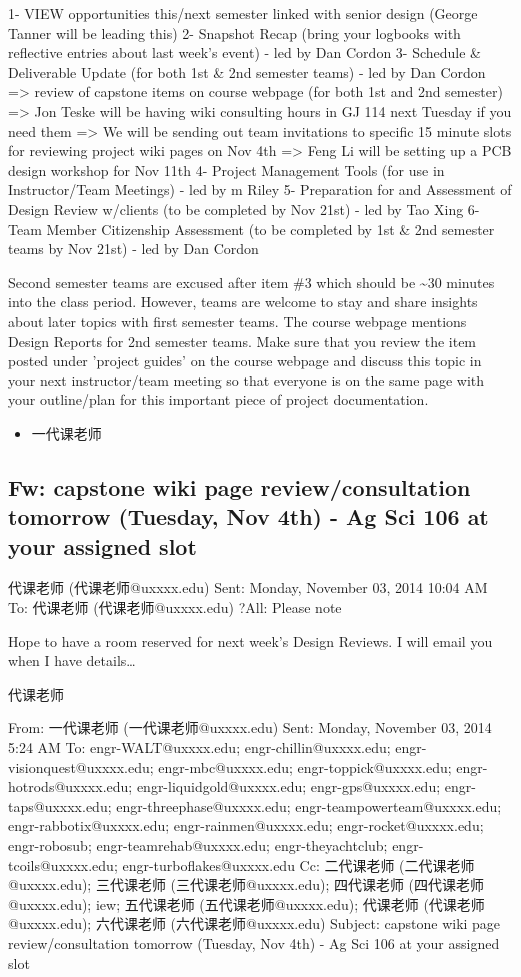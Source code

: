 \documentclass[12pt]{book}
\begin{document}
1- VIEW opportunities this/next semester linked with senior design (George Tanner will be leading this)
2- Snapshot Recap (bring your logbooks with reflective entries about last week's event) - led by Dan Cordon
3- Schedule \& Deliverable Update (for both 1st \& 2nd semester teams) - led by Dan Cordon
=> review of capstone items on course webpage (for both 1st and 2nd semester)
=> Jon Teske will be having wiki consulting hours in GJ 114 next Tuesday if you need them
=> We will be sending out team invitations to specific 15 minute slots for reviewing project wiki pages on Nov 4th
=> Feng Li will be setting up a PCB design workshop for Nov 11th
4- Project Management Tools (for use in Instructor/Team Meetings) - led by m Riley
5- Preparation for and Assessment of Design Review w/clients (to be completed by Nov 21st) - led by Tao Xing
6- Team Member Citizenship Assessment (to be completed by 1st \& 2nd semester teams by Nov 21st) - led by Dan Cordon

Second semester teams are excused after item \#3 which should be \textasciitilde{}30 minutes into the class period.  However, teams are welcome to stay and share insights about later topics with first semester teams.  The course webpage mentions Design Reports for 2nd semester teams.  Make sure that you review the item posted under 'project guides' on the course webpage and discuss this topic in your next instructor/team meeting so that everyone is on the same page with your outline/plan for this important piece of project documentation.

\begin{itemize}
\item 一代课老师
\end{itemize}

\subsection{Fw: capstone wiki page review/consultation tomorrow (Tuesday, Nov 4th) - Ag Sci 106 at your assigned slot}
\label{sec-18-1-2}
代课老师 (代课老师@uxxxx.edu)
Sent:        Monday, November 03, 2014 10:04 AM
To:        
代课老师 (代课老师@uxxxx.edu)
?All:  Please note

Hope to have a room reserved for next week's Design Reviews.  I will email
you when I have details\ldots{}

代课老师

From: 一代课老师 (一代课老师@uxxxx.edu)
Sent: Monday, November 03, 2014 5:24 AM
To: engr-WALT@uxxxx.edu; engr-chillin@uxxxx.edu; engr-visionquest@uxxxx.edu; engr-mbc@uxxxx.edu; engr-toppick@uxxxx.edu; engr-hotrods@uxxxx.edu; engr-liquidgold@uxxxx.edu; engr-gps@uxxxx.edu; engr-taps@uxxxx.edu; engr-threephase@uxxxx.edu; engr-teampowerteam@uxxxx.edu; engr-rabbotix@uxxxx.edu; engr-rainmen@uxxxx.edu; engr-rocket@uxxxx.edu; engr-robosub; engr-teamrehab@uxxxx.edu; engr-theyachtclub; engr-tcoils@uxxxx.edu; engr-turboflakes@uxxxx.edu
Cc: 二代课老师 (二代课老师@uxxxx.edu); 三代课老师 (三代课老师@uxxxx.edu); 四代课老师 (四代课老师@uxxxx.edu); iew; 五代课老师 (五代课老师@uxxxx.edu); 代课老师 (代课老师@uxxxx.edu); 六代课老师 (六代课老师@uxxxx.edu)
Subject: capstone wiki page review/consultation tomorrow (Tuesday, Nov 4th) - Ag Sci 106 at your assigned slot
\end{document}

